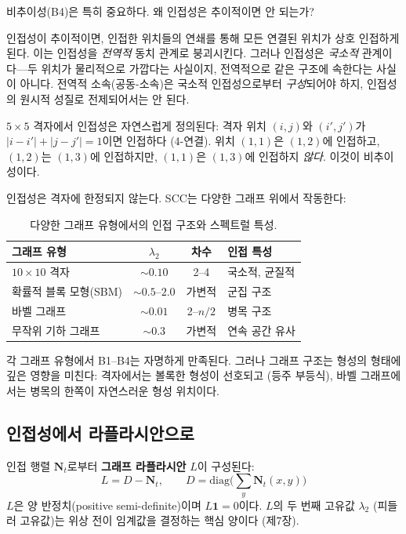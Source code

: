 비추이성(B4)은 특히 중요하다. 왜 인접성은 추이적이면 안 되는가?

인접성이 추이적이면, 인접한 위치들의 연쇄를 통해 모든 연결된 위치가 상호 인접하게 된다. 이는 인접성을 \emph{전역적} 동치 관계로 붕괴시킨다. 그러나 인접성은 \emph{국소적} 관계이다---두 위치가 물리적으로 가깝다는 사실이지, 전역적으로 같은 구조에 속한다는 사실이 아니다. 전역적 소속(공동-소속)은 국소적 인접성으로부터 \emph{구성}되어야 하지, 인접성의 원시적 성질로 전제되어서는 안 된다.

\begin{example}
$5 \times 5$ 격자에서 인접성은 자연스럽게 정의된다: 격자 위치 $(i,j)$와 $(i', j')$가 $|i-i'| + |j-j'| = 1$이면 인접하다 (4-연결). 위치 $(1,1)$은 $(1,2)$에 인접하고, $(1,2)$는 $(1,3)$에 인접하지만, $(1,1)$은 $(1,3)$에 인접하지 \emph{않다}. 이것이 비추이성이다.
\end{example}

\begin{example}[다양한 인접 구조]
인접성은 격자에 한정되지 않는다. SCC는 다양한 그래프 위에서 작동한다:

\begin{table}[h]
\centering
\begin{tabular}{lccl}
\hline
\textbf{그래프 유형} & $\lambda_2$ & \textbf{차수} & \textbf{인접 특성} \\
\hline
$10 \times 10$ 격자 & $\sim 0.10$ & 2--4 & 국소적, 균질적 \\
확률적 블록 모형(SBM) & $\sim 0.5$--$2.0$ & 가변적 & 군집 구조 \\
바벨 그래프 & $\sim 0.01$ & 2--$n/2$ & 병목 구조 \\
무작위 기하 그래프 & $\sim 0.3$ & 가변적 & 연속 공간 유사 \\
\hline
\end{tabular}
\caption{다양한 그래프 유형에서의 인접 구조와 스펙트럴 특성.}
\label{tab:graph-types}
\end{table}

각 그래프 유형에서 B1--B4는 자명하게 만족된다. 그러나 그래프 구조는 형성의 형태에 깊은 영향을 미친다: 격자에서는 볼록한 형성이 선호되고 (등주 부등식), 바벨 그래프에서는 병목의 한쪽이 자연스러운 형성 위치이다.
\end{example}

\subsection{인접성에서 라플라시안으로}

인접 행렬 $\mathbf{N}_t$로부터 \textbf{그래프 라플라시안} $L$이 구성된다:
\begin{equation}
    L = D - \mathbf{N}_t, \qquad D = \mathrm{diag}\Big(\sum_y \mathbf{N}_t(x,y)\Big)
    \label{eq:graph-laplacian}
\end{equation}
$L$은 양 반정치(positive semi-definite)이며 $L \mathbf{1} = 0$이다. $L$의 두 번째 고유값 $\lambda_2$ (피들러 고유값)는 위상 전이 임계값을 결정하는 핵심 양이다 (제7장).

